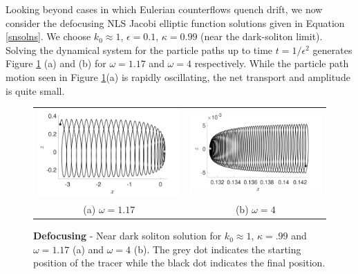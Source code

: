 \documentclass{JFM_Style/jfm}
\begin{document}
Looking beyond cases in which Eulerian counterflows quench drift, we now consider the defocusing NLS Jacobi elliptic function solutions given in Equation \eqref{snsolns}.  We choose $k_{0}\approx1$, $\epsilon=0.1$, $\kappa=0.99$ (near the dark-soliton limit).  Solving the dynamical system for the particle paths up to time $t=1/\epsilon^{2}$ generates Figure \ref{fig:defoc_kap_pt99} (a) and (b) for $\omega= 1.17$ and $\omega= 4$ respectively.  While the particle path motion seen in Figure \ref{fig:defoc_kap_pt99}(a) is rapidly oscillating, the net transport and amplitude is quite small.
\begin{figure}
\centering
\begin{tabular}{cc}
\includegraphics[width=.48\textwidth]{om_val_1pt17_k0_1_ep_pt1_defoc_ztrack} &\includegraphics[width=.48\textwidth]{om_val_4_k0_1_ep_pt1_defoc_ztrack} \\
(a) $\omega = 1.17$ & (b) $\omega=4$
\end{tabular}
\caption{\small {\bf Defocusing} - Near dark soliton solution for $k_{0}\approx1$, $\kappa=.99$ and $\omega=1.17$ (a) and $\omega=4$ (b).  The grey dot indicates the starting position of the tracer while the black dot indicates the final position.}
\label{fig:defoc_kap_pt99}
\end{figure}
\end{document}

